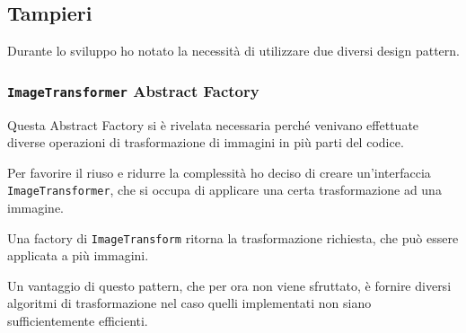 \documentclass[a4paper,12pt]{report}
\begin{document}
    \subsection{Tampieri}
    \par Durante lo sviluppo ho notato la necessità di utilizzare due diversi design pattern.
    \subsubsection{\texttt{ImageTransformer} Abstract Factory}
    \par
    \par Questa Abstract Factory si è rivelata necessaria perché venivano effettuate diverse operazioni di trasformazione di
    immagini in più parti del codice.
    \par Per favorire il riuso e ridurre la complessità ho deciso di creare un'interfaccia \texttt{ImageTransformer}, che si occupa di applicare una certa trasformazione ad una immagine.
    \par Una factory di \texttt{ImageTransform} ritorna la trasformazione richiesta, che può essere applicata a più immagini.
    \par Un vantaggio di questo pattern, che per ora non viene sfruttato, è fornire diversi algoritmi di trasformazione
    nel caso quelli implementati non siano sufficientemente efficienti.
\end{document}
